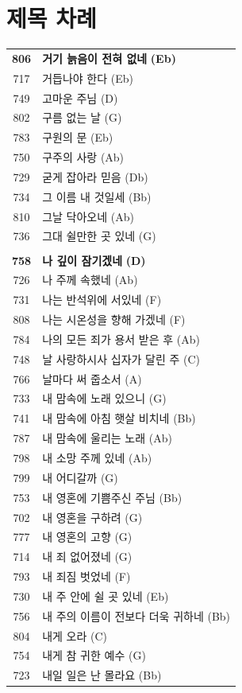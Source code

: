 \section*{제목 차례}
\begin{supertabular}{c l}
\textbf{806} & \textbf{거기 늙음이 전혀 없네} \textbf{(Eb)} \\
717 & 거듭나야 한다 (Eb) \\
749 & 고마운 주님 (D) \\
802 & 구름 없는 날 (G) \\
783 & 구원의 문 (Eb) \\
750 & 구주의 사랑 (Ab) \\
729 & 굳게 잡아라 믿음 (Db) \\
734 & 그 이름 내 것일세 (Bb) \\
810 & 그날 닥아오네 (Ab) \\
736 & 그대 쉴만한 곳 있네 (G) \\
 & \\
\textbf{758} & \textbf{나 깊이 잠기겠네} \textbf{(D)} \\
726 & 나 주께 속했네 (Ab) \\
731 & 나는 반석위에 서있네 (F) \\
808 & 나는 시온성을 향해 가겠네 (F) \\
784 & 나의 모든 죄가 용서 받은 후 (Ab) \\
748 & 날 사랑하시사 십자가 달린 주 (C) \\
766 & 날마다 써 줍소서 (A) \\
733 & 내 맘속에 노래 있으니 (G) \\
741 & 내 맘속에 아침 햇살 비치네 (Bb) \\
787 & 내 맘속에 울리는 노래 (Ab) \\
798 & 내 소망 주께 있네 (Ab) \\
799 & 내 어디갈까 (G) \\
753 & 내 영혼에 기쁨주신 주님 (Bb) \\
702 & 내 영혼을 구하려 (G) \\
777 & 내 영혼의 고향 (G) \\
714 & 내 죄 없어졌네 (G) \\
793 & 내 죄짐 벗었네 (F) \\
730 & 내 주 안에 쉴 곳 있네 (Eb) \\
756 & 내 주의 이름이 전보다 더욱 귀하네 (Bb) \\
804 & 내게 오라 (C) \\
754 & 내게 참 귀한 예수 (G) \\
723 & 내일 일은 난 몰라요 (Bb) \\

\end{supertabular}
